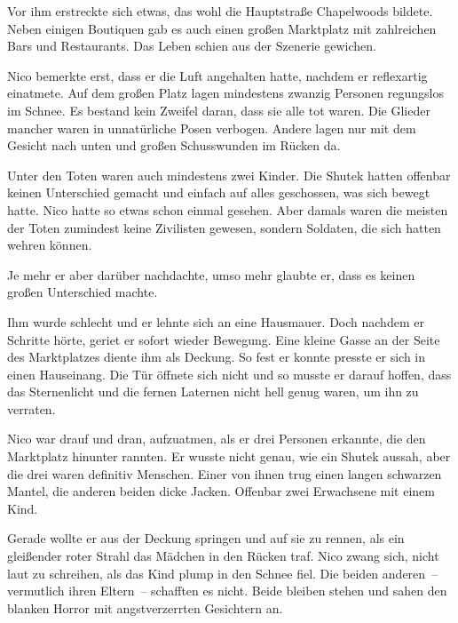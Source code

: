 \par

Vor ihm erstreckte sich etwas, das wohl die Hauptstraße Chapelwoods bildete. Neben einigen Boutiquen gab es auch einen großen Marktplatz mit zahlreichen Bars und Restaurants. Das Leben schien aus der Szenerie gewichen.

\par

Nico bemerkte erst, dass er die Luft angehalten hatte, nachdem er reflexartig einatmete. Auf dem großen Platz lagen mindestens zwanzig Personen regungslos im Schnee. Es bestand kein Zweifel daran, dass sie alle tot waren. Die Glieder mancher waren in unnatürliche Posen verbogen. Andere lagen nur mit dem Gesicht nach unten und großen Schusswunden im Rücken da.

\par

Unter den Toten waren auch mindestens zwei Kinder. Die Shutek hatten offenbar keinen Unterschied gemacht und einfach auf alles geschossen, was sich bewegt hatte. Nico hatte so etwas schon einmal gesehen. Aber damals waren die meisten der Toten zumindest keine Zivilisten gewesen, sondern Soldaten, die sich hatten wehren können.

\par

Je mehr er aber darüber nachdachte, umso mehr glaubte er, dass es keinen großen Unterschied machte.

\par

Ihm wurde schlecht und er lehnte sich an eine Hausmauer. Doch nachdem er Schritte hörte, geriet er sofort wieder Bewegung. Eine kleine Gasse an der Seite des Marktplatzes diente ihm als Deckung. So fest er konnte presste er sich in einen Hauseinang. Die Tür öffnete sich nicht und so musste er darauf hoffen, dass das Sternenlicht und die fernen Laternen nicht hell genug waren, um ihn zu verraten.

\par

Nico war drauf und dran, aufzuatmen, als er drei Personen erkannte, die den Marktplatz hinunter rannten. Er wusste nicht genau, wie ein Shutek aussah, aber die drei waren definitiv Menschen. Einer von ihnen trug einen langen schwarzen Mantel, die anderen beiden dicke Jacken. Offenbar zwei Erwachsene mit einem Kind.

\par

Gerade wollte er aus der Deckung springen und auf sie zu rennen, als ein gleißender roter Strahl das Mädchen in den Rücken traf. Nico zwang sich, nicht laut zu schreihen, als das Kind plump in den Schnee fiel. Die beiden anderen~-- vermutlich ihren Eltern~-- schafften es nicht. Beide bleiben stehen und sahen den blanken Horror mit angstverzerrten Gesichtern an.


